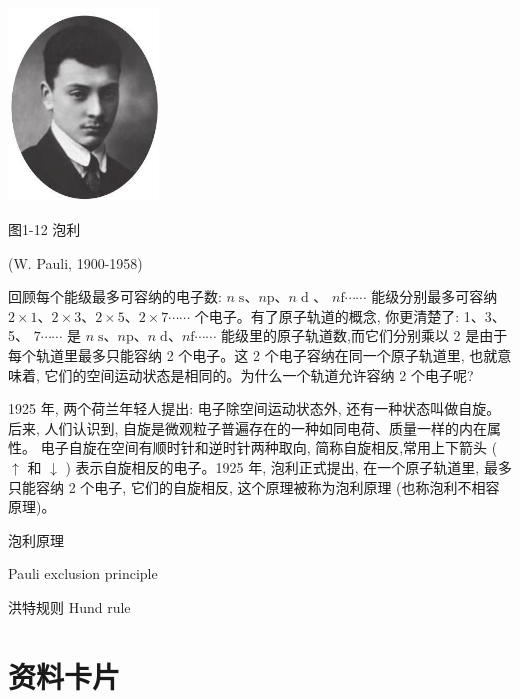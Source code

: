 \documentclass[10pt]{article}
\begin{document}
\begin{center}
\includegraphics[max width=0.3\textwidth]{images/0190e026-5a11-7df7-bd27-54d09026ba7a_17_671625.jpg}
\end{center}

图1-12 泡利

(W. Pauli, 1900-1958)

回顾每个能级最多可容纳的电子数: \(n\mathrm{\;s}\text{、}n\mathrm{p}\text{、}n\mathrm{\;d}\) 、 \(n\mathrm{f}\cdots \cdots\) 能级分别最多可容纳 \(2 \times 1\text{、}2 \times 3\text{、}2 \times 5\text{、}2 \times 7\cdots \cdots\) 个电子。有了原子轨道的概念, 你更清楚了: 1、3、5、 \(7\cdots \cdots\) 是 \(n\mathrm{\;s}\text{、}n\mathrm{p}\text{、}n\mathrm{\;d}\text{、}n\mathrm{f}\cdots \cdots\) 能级里的原子轨道数,而它们分别乘以 2 是由于每个轨道里最多只能容纳 2 个电子。这 2 个电子容纳在同一个原子轨道里, 也就意味着, 它们的空间运动状态是相同的。为什么一个轨道允许容纳 2 个电子呢?

1925 年, 两个荷兰年轻人提出: 电子除空间运动状态外, 还有一种状态叫做自旋。后来, 人们认识到, 自旋是微观粒子普遍存在的一种如同电荷、质量一样的内在属性。 电子自旋在空间有顺时针和逆时针两种取向, 简称自旋相反,常用上下箭头 ( \(\uparrow\) 和 \(\downarrow\) ) 表示自旋相反的电子。1925 年, 泡利正式提出, 在一个原子轨道里, 最多只能容纳 2 个电子, 它们的自旋相反, 这个原理被称为泡利原理 (也称泡利不相容原理)。

\begin{mdframed}

泡利原理

Pauli exclusion principle

洪特规则 Hund rule

\end{mdframed}


\section*{资料卡片}
\end{document}
